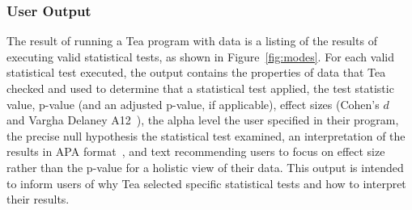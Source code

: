 \subsubsection{User Output}
The result of running a Tea program with data is a listing of the results of
executing valid statistical tests, as shown in Figure~\ref{fig:modes}. For each valid
statistical test executed, the output contains the properties of data that Tea
checked and used to determine that a statistical test applied, the test
statistic value, p-value (and an adjusted p-value, if applicable), effect sizes
(Cohen's $d$~\cite{cohen1988statistical} and Vargha Delaney
A12~\cite{vargha2000critique}), the alpha level the user specified in their
program, the precise null hypothesis the statistical test examined, an
interpretation of the results in APA format~\cite{american1983publication}, and text
recommending users to focus on effect size rather than the p-value for a
holistic view of their data. This output is intended to inform users of why Tea
selected specific statistical tests and how to interpret their results.

